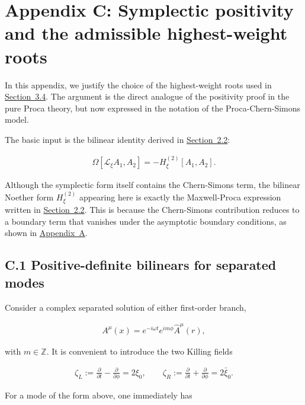 \section{Appendix C: Symplectic positivity and the admissible highest-weight roots}\label{app:symplectic-positivity}

In this appendix, we justify the choice of the highest-weight roots used in \hyperref[subsec:solving-modes]{Section~3.4}. The argument is the direct analogue of the positivity proof in the pure Proca theory, but now expressed in the notation of the Proca-Chern-Simons model.

The basic input is the bilinear identity derived in \hyperref[subsec:noether-killing-symmetries]{Section~2.2}:

\begin{align}
\Omega[\mathcal{L}_{\xi}A_{1},A_{2}] = - H_{\xi}^{(2)}[A_{1},A_{2}].
\end{align}

Although the symplectic form itself contains the Chern-Simons term, the bilinear Noether form $H_{\xi}^{(2)}$ appearing here is exactly the Maxwell-Proca expression written in \hyperref[subsec:noether-killing-symmetries]{Section~2.2}. This is because the Chern-Simons contribution reduces to a boundary term that vanishes under the asymptotic boundary conditions, as shown in \hyperref[app:near-boundary-contributions]{Appendix~A}.

\subsection{C.1 Positive-definite bilinears for separated modes}\label{subsec:positive-definite-bilinears}

Consider a complex separated solution of either first-order branch,

\begin{align}
A^{\mu}(x) = e^{-i \omega t} e^{i m \phi} \widehat{A}^{\mu}(r),
\end{align}

with $m \in \mathbb{Z}$. It is convenient to introduce the two Killing fields

\begin{align}
\zeta_{L} := \frac{\partial}{\partial t} - \frac{\partial}{\partial \phi} = 2 \xi_{0},
\qquad
\zeta_{R} := \frac{\partial}{\partial t} + \frac{\partial}{\partial \phi} = 2 \bar{\xi}_{0}.
\end{align}

For a mode of the form above, one immediately has

